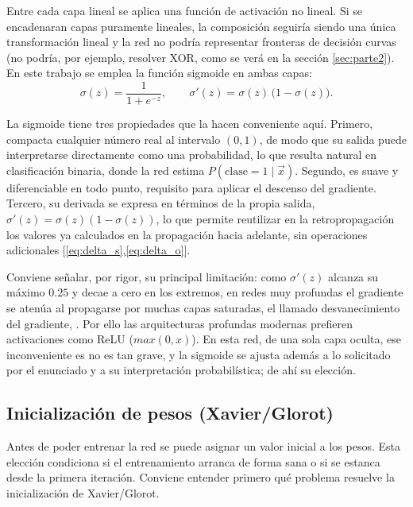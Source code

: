 \documentclass[11pt,a4paper]{article}
\begin{document}
Entre cada capa lineal se aplica una función de activación no lineal. Si se encadenaran capas puramente lineales, la composición
seguiría siendo una única transformación lineal y la red no podría representar
fronteras de decisión curvas (no podría, por ejemplo, resolver XOR, como se verá
en la sección \ref{sec:parte2}). En este trabajo se emplea la función
sigmoide en ambas capas:
\begin{equation}
  \sigma(z)=\frac{1}{1+e^{-z}},\qquad
  \sigma'(z)=\sigma(z)\,\bigl(1-\sigma(z)\bigr).
  \label{eq:sigmoid}
\end{equation}

La sigmoide tiene tres propiedades que la hacen conveniente aquí. Primero, compacta cualquier número real al intervalo $(0,1)$, de modo que su salida
puede interpretarse directamente como una probabilidad, lo que resulta natural en
clasificación binaria, donde la red estima $P(\text{clase}=1\mid \vec{x})$.
Segundo, es suave y diferenciable en todo punto, requisito para aplicar el
descenso del gradiente. Tercero, su derivada se expresa en términos de la propia
salida, $\sigma'(z)=\sigma(z)(1-\sigma(z))$, lo que permite reutilizar en la
retropropagación los valores ya calculados en la propagación hacia adelante, sin
operaciones adicionales [\ref{eq:delta_s},\ref{eq:delta_o}].

Conviene señalar, por rigor, su principal limitación: como $\sigma'(z)$ alcanza
su máximo $0.25$ y decae a cero en los extremos, en redes muy
profundas el gradiente se atenúa al propagarse por muchas capas saturadas, el llamado desvanecimiento del gradiente, \cite{glorot2010,pascanu2013}.
Por ello las arquitecturas profundas modernas prefieren activaciones como ReLU ($max(0,x)$).
En esta red, de una sola capa oculta, ese inconveniente es no es tan grave, y la
sigmoide se ajusta además a lo solicitado por el enunciado y a su interpretación
probabilística; de ahí su elección.

\subsection{Inicialización de pesos (Xavier/Glorot)}

Antes de poder entrenar la red se puede asignar un valor inicial a los pesos.
Esta elección condiciona si el entrenamiento arranca de forma sana
o si se estanca desde la primera iteración. Conviene entender primero qué
problema resuelve la inicialización de Xavier/Glorot.
\end{document}
